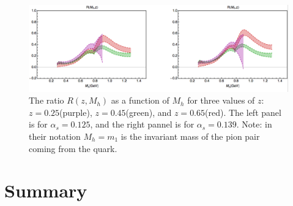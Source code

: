 \documentclass[abstract = on,listof=totoc, bibliography=totoc]{scrreprt}
\begin{document}
 \begin{figure}
\begin{center}
\includegraphics[width = 1\textwidth]{extractionIFF2}
\caption[Extraction of IFF from Belle data]{The ratio $R(z,M_h)$ as a function of $M_h$ for three values of $z$: $z = 0.25$(purple), $z=0.45$(green), and $z=0.65$(red). The left panel is for $\alpha_s = 0.125$, and the right pannel is for $\alpha_s = 0.139$\cite{RealEstValTrans}. Note: in their notation $M_h = m_1$ is the invariant mass of the pion pair coming from the quark.}
\label{fig:extractionIFF}
\end{center}
\end{figure}




\section{Summary}
\end{document}
